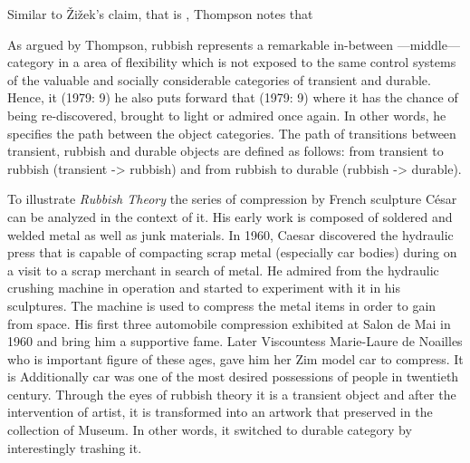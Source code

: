 Similar to Žižek’s claim, that is , Thompson notes that 

As argued by Thompson, rubbish represents a remarkable in-between ---middle--- category in a area of flexibility which is not exposed to the same control systems of the valuable and socially considerable categories of transient and durable. Hence, it  (1979: 9) he also puts forward that  (1979: 9) where it has the chance of being re-discovered, brought to light or admired once again. In other words, he specifies the path between the object categories. The path of transitions between transient, rubbish and durable objects are defined as follows: from transient to rubbish (transient -> rubbish) and from rubbish to durable (rubbish -> durable).

To illustrate \textit{Rubbish Theory} the series of compression by French sculpture César can be analyzed in the context of it. His early work is composed of soldered and welded metal as well as junk materials. In 1960, Caesar discovered the hydraulic press that is capable of compacting scrap metal (especially car bodies) during on a visit to a scrap merchant in search of metal. He admired from the hydraulic crushing machine in operation and started to experiment with it in his sculptures. The machine is used to compress the metal items in order to gain from space. His first three automobile compression exhibited at Salon de Mai in 1960 and bring him a supportive fame. Later Viscountess Marie-Laure de Noailles who is important figure of these ages, gave him her Zim model car to compress. It is 
 Additionally car was one of the most desired possessions of people in twentieth century. Through the eyes of rubbish theory it is a transient object and after the intervention of artist, it is transformed into an artwork that preserved in the collection of Museum. In other words, it switched to durable category by interestingly trashing it.

